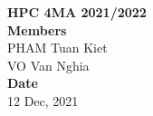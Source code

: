 \onehalfspacing


\vspace*{\fill}
\begin{center}
  \Large{\textbf{HPC 4MA 2021/2022}}\\
  \vspace*{1\baselineskip}
  \Large{\textbf{Members}}\\
  PHAM Tuan Kiet\\
  VO Van Nghia\\
  \vfill
  \vspace*{\fill}
  \Large{\textbf{Date}}\\
  12 Dec, 2021
\end{center}

\newpage

\newpage
{}
\tableofcontents
{}

\newpage
{}
